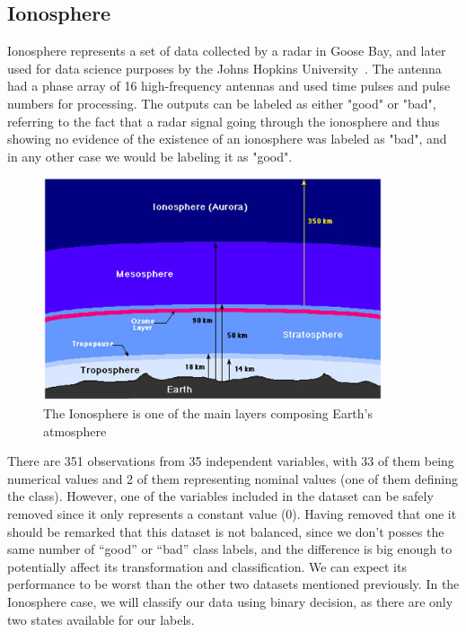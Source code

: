 \subsection{Ionosphere}
\label{subsec:Ionosphere}

Ionosphere represents a set of data collected by a radar in Goose Bay, and later used for data science purposes by the Johns Hopkins University~\cite{Sigillito1989ClassificationOR}. The antenna had a phase array of 16 high-frequency antennas and used time pulses and pulse numbers for processing. The outputs can be labeled as either "good" or "bad", referring to the fact that a radar signal going through the ionosphere and thus showing no evidence of the existence of an ionosphere was labeled as "bad", and in any other case we would be labeling it as "good". %
%
\begin{figure}[H]
	\centering
	\includegraphics[width=10cm]{Figuras_tfg/Ionosphere}
	\caption{The Ionosphere is one of the main layers composing Earth's atmosphere}
	\label{fig:figure_pairs_ionosp}
\end{figure}

There are 351 observations from 35 independent variables, with 33 of them being numerical values and 2 of them representing nominal values (one of them defining the class). However, one of the variables included in the dataset can be safely removed since it only represents a constant value (0). Having removed that one it should be remarked that this dataset is not balanced, since we don't posses the same number of ``good'' or ``bad'' class labels, and the difference is big enough to potentially affect its transformation and classification. We can expect its performance to be worst than the other two datasets mentioned previously. In the Ionosphere case, we will classify our data using binary decision, as there are only two states available for our labels. \par

